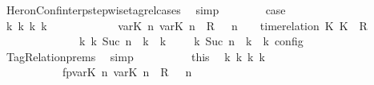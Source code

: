 \begin{isabellebody}
\ HeronConf{\isacharunderscore}interp{\isacharunderscore}stepwise{\isacharunderscore}tagrel{\isacharunderscore}cases\ \isamarkupfalse%
\ simp\isanewline
\ \ \ \ \ \ \isamarkupfalse%
\ {\isacharquery}case\isanewline
\ \ \ \ \ \ \isamarkupfalse%
\ {\isacharminus}\isanewline
\ \ \ \ \ \ \ \ \isamarkupfalse%
\ {\isacartoucheopen}{\isasymexists}{\isasymGamma}\isactrlsub k\ {\isasymPsi}\isactrlsub k\ {\isasymPhi}\isactrlsub k\ k{\isachardot}\isanewline
\ \ \ \ \ \ \ \ \ \ \ \ {\isacharparenleft}{\isacharparenleft}{\isacharparenleft}{\isacharparenleft}{\isasymlfloor}{\isasymtau}\isactrlsub v\isactrlsub a\isactrlsub r{\isacharparenleft}K\ n{\isacharparenright}{\isacharcomma}\ {\isasymtau}\isactrlsub v\isactrlsub a\isactrlsub r{\isacharparenleft}K\ n{\isacharparenright}{\isasymrfloor}\ {\isasymin}\ R{\isacharparenright}\ {\isacharhash}\ {\isasymGamma}{\isacharparenright}{\isacharcomma}\ n\ {\isasymturnstile}\ {\isasymPsi}\ {\isasymtriangleright}\ {\isacharparenleft}{\isacharparenleft}time{\isacharminus}relation\ {\isasymlfloor}K\ K\ {\isasymin}\ R{\isacharparenright}\ {\isacharhash}\ {\isasymPhi}{\isacharparenright}{\isacharparenright}\isanewline
\ \ \ \ \ \ \ \ \ \ \ \ \ \ {\isasymhookrightarrow}\isactrlbsup k\isactrlesup \ {\isacharparenleft}{\isasymGamma}\isactrlsub k{\isacharcomma}\ Suc\ n\ {\isasymturnstile}\ {\isasymPsi}\isactrlsub k\ {\isasymtriangleright}\ {\isasymPhi}\isactrlsub k{\isacharparenright}{\isacharparenright}\ {\isasymand}\ {\isasymrho}\ {\isasymin}\ {\isasymlbrakk}\ {\isasymGamma}\isactrlsub k{\isacharcomma}\ Suc\ n\ {\isasymturnstile}\ {\isasymPsi}\isactrlsub k\ {\isasymtriangleright}\ {\isasymPhi}\isactrlsub k\ {\isasymrbrakk}\isactrlsub c\isactrlsub o\isactrlsub n\isactrlsub f\isactrlsub i\isactrlsub g{\isacartoucheclose}\isanewline
\ \ \ \ \ \ \ \ \ \ \isamarkupfalse%
\ TagRelation{\isachardot}prems\ \isamarkupfalse%
\ simp\isanewline
\isanewline
\ \ \ \ \ \ \ \ \isamarkupfalse%
\ this\ \isamarkupfalse%
\ {\isasymGamma}\isactrlsub k\ {\isasymPsi}\isactrlsub k\ {\isasymPhi}\isactrlsub k\ k\isanewline
\ \ \ \ \ \ \ \ \ \ \ fp{\isacharcolon}{\isacartoucheopen}{\isacharparenleft}{\isacharparenleft}{\isacharparenleft}{\isacharparenleft}{\isasymlfloor}{\isasymtau}\isactrlsub v\isactrlsub a\isactrlsub r{\isacharparenleft}K\ n{\isacharparenright}{\isacharcomma}\ {\isasymtau}\isactrlsub v\isactrlsub a\isactrlsub r{\isacharparenleft}K\ n{\isacharparenright}{\isasymrfloor}\ {\isasymin}\ R{\isacharparenright}\ {\isacharhash}\ {\isasymGamma}{\isacharparenright}{\isacharcomma}\ n\isanewline

\end{isabellebody}
